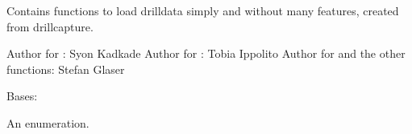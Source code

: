 \documentclass[letterpaper,10pt,english]{sphinxmanual}
\begin{document}
\sphinxAtStartPar
Contains functions to load drill\sphinxhyphen{}data simply and without many features, created from drillcapture.

\sphinxAtStartPar
Author for {\hyperref[\detokenize{anoog.io:anoog.io.csv_io.read_csv}]{}}: Syon Kadkade
Author for {\hyperref[\detokenize{anoog.io:anoog.io.csv_io.load_single_data}]{}}: Tobia Ippolito
Author for {\hyperref[\detokenize{anoog.io:anoog.io.csv_io.read_csv}]{}} and the other functions: Stefan Glaser

\begin{fulllineitems}
\label{\detokenize{anoog.io:anoog.io.csv_io.loadData_mode}}
\sphinxAtStartPar
Bases: 

\sphinxAtStartPar
An enumeration.

\begin{fulllineitems}
\label{\detokenize{anoog.io:anoog.io.csv_io.loadData_mode.DASK}}
\end{fulllineitems}


\begin{fulllineitems}
\label{\detokenize{anoog.io:anoog.io.csv_io.loadData_mode.NONE}}
\end{fulllineitems}


\end{fulllineitems}

\end{document}
